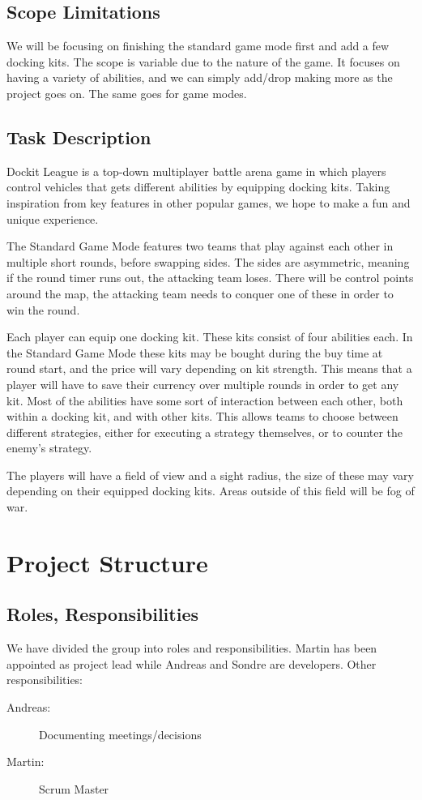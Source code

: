 \subsection*{Scope Limitations}
We will be focusing on finishing the standard game mode first and add a few docking kits. The scope is variable due to the nature of the game. It focuses on having a variety of abilities, and we can simply add/drop making more as the project goes on. The same goes for game modes.

\subsection*{Task Description}
Dockit League is a top-down multiplayer battle arena game in which players control vehicles that gets different abilities by equipping docking kits. 
Taking inspiration from key features in other popular games, we hope to make a fun and unique experience.

The Standard Game Mode features two teams that play against each other in multiple short rounds, before swapping sides. The sides are asymmetric, meaning if the round timer runs out, the attacking team loses. There will be control points around the map, the attacking team needs to conquer one of these in order to win the round.

Each player can equip one docking kit. These kits consist of four abilities each. In the Standard Game Mode these kits may be bought during the buy time at round start, and the price will vary depending on kit strength. This means that a player will have to save their currency over multiple rounds in order to get any kit.
Most of the abilities have some sort of interaction between each other, both within a docking kit, and with other kits. This allows teams to choose between different strategies, either for executing a strategy themselves, or to counter the enemy's strategy.

The players will have a field of view and a sight radius, the size of these may vary depending on their equipped docking kits. Areas outside of this field will be fog of war. 

\section{Project Structure}
\subsection*{Roles, Responsibilities}
We have divided the group into roles and responsibilities. Martin has been appointed as project lead while Andreas and Sondre are developers. Other responsibilities:
\begin{description}
    \item[Andreas:] Documenting meetings/decisions
    \item[Martin:] Scrum Master
\end{description}

